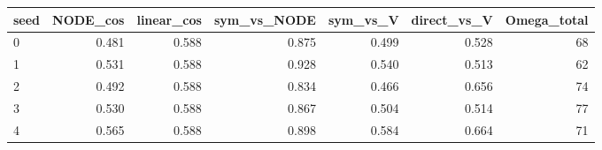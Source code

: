 \begin{tabular}{lrrrrrr}
\hline
seed & NODE\_cos & linear\_cos & sym\_vs\_NODE & sym\_vs\_V & direct\_vs\_V & Omega\_total \\
\hline
0 & 0.481 & 0.588 & 0.875 & 0.499 & 0.528 & 68 \\
1 & 0.531 & 0.588 & 0.928 & 0.540 & 0.513 & 62 \\
2 & 0.492 & 0.588 & 0.834 & 0.466 & 0.656 & 74 \\
3 & 0.530 & 0.588 & 0.867 & 0.504 & 0.514 & 77 \\
4 & 0.565 & 0.588 & 0.898 & 0.584 & 0.664 & 71 \\
\hline
\end{tabular}
